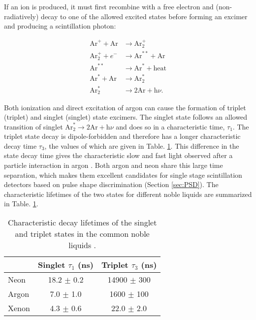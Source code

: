 If an ion is produced, it must first recombine with a free electron and (non-radiatively) decay to one of the allowed excited states before forming an excimer and producing a scintillation photon:

\begin{equation}
\begin{split}
\text{Ar}^{+}+\text{Ar} &\rightarrow \text{Ar}_{2}^{+}\\
\text{Ar}_{2}^{+} + e^{-} &\rightarrow \text{Ar}^{**} + \text{Ar}\\
\text{Ar}^{**} &\rightarrow \text{Ar}^{*} + \text{heat}\\
\text{Ar}^{*} + \text{Ar} &\rightarrow \text{Ar}_{2}^{*}\\
\text{Ar}_{2}^{*} &\rightarrow 2\text{Ar} + \text{h}\nu .
\end{split}
\label{Eq:ionizeDecay}
\end{equation}



Both ionization and direct excitation of argon can cause the formation of triplet (\gls{triplet}) and singlet (\gls{singlet}) state excimers. The \gls{singlet} state follows an allowed transition of \gls{singlet} $\text{Ar}_{2}^{*} \rightarrow 2\text{Ar} + \text{h}\nu$ and does so in a characteristic time, $\tau_1$. The \gls{triplet} state decay is dipole-forbidden and therefore has a longer characteristic decay time $\tau_3$, the values of which are given in Table. \ref{Table:scintTime}. This difference in the state decay time gives the characteristic slow and fast light observed after a particle interaction in argon \cite{1983HitachiXenonAndArgonLuminesince}. Both argon and neon share this large time separation, which makes them excellent candidates for single stage scintillation detectors based on pulse shape discrimination (Section \ref{sec:PSD}). The characteristic lifetimes of the two states for different noble liquids are summarized in Table. \ref{Table:scintTime}.

\begin{table}
\centering
\caption{Characteristic decay lifetimes of the singlet and triplet states in the common noble liquids \cite{argonScintillation}.}
\begin{tabular}{l	c	c}
\hline
\hline
&	Singlet $\tau_1$ (ns)&	Triplet $\tau_3$ (ns)\\
\hline
Neon&	18.2 $\pm$ 0.2&	14900 $\pm$ 300\\
Argon&	7.0 $\pm$ 1.0&	1600 $\pm$ 100\\
Xenon&	4.3 $\pm$ 0.6&	22.0 $\pm$ 2.0\\
\hline
\hline
\end{tabular}
\label{Table:scintTime}
\end{table}


